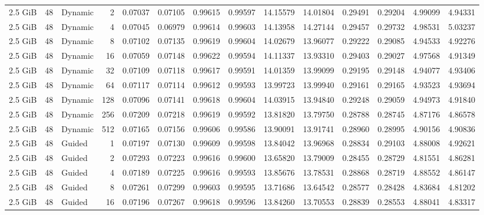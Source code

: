 \begin{table}[H]
\begin{adjustbox}{width=\textwidth, keepaspectratio}
\begin{tabular}{rrlrrrrrrrrrrr}
                    2.5 GiB & 48 & Dynamic & 2 & 0.07037 & 0.07105 & 0.99615 & 0.99597 & 14.15579 & 14.01804 & 0.29491 & 0.29204 & 4.99099 & 4.94331 \\
                    2.5 GiB & 48 & Dynamic & 4 & 0.07045 & 0.06979 & 0.99614 & 0.99603 & 14.13958 & 14.27144 & 0.29457 & 0.29732 & 4.98531 & 5.03237 \\
                    2.5 GiB & 48 & Dynamic & 8 & 0.07102 & 0.07135 & 0.99619 & 0.99604 & 14.02679 & 13.96077 & 0.29222 & 0.29085 & 4.94533 & 4.92276 \\
                    2.5 GiB & 48 & Dynamic & 16 & 0.07059 & 0.07148 & 0.99622 & 0.99594 & 14.11337 & 13.93310 & 0.29403 & 0.29027 & 4.97568 & 4.91349 \\
                    2.5 GiB & 48 & Dynamic & 32 & 0.07109 & 0.07118 & 0.99617 & 0.99591 & 14.01359 & 13.99099 & 0.29195 & 0.29148 & 4.94077 & 4.93406 \\
                    2.5 GiB & 48 & Dynamic & 64 & 0.07117 & 0.07114 & 0.99612 & 0.99593 & 13.99723 & 13.99940 & 0.29161 & 0.29165 & 4.93523 & 4.93694 \\
                    2.5 GiB & 48 & Dynamic & 128 & 0.07096 & 0.07141 & 0.99618 & 0.99604 & 14.03915 & 13.94840 & 0.29248 & 0.29059 & 4.94973 & 4.91840 \\
                    2.5 GiB & 48 & Dynamic & 256 & 0.07209 & 0.07218 & 0.99619 & 0.99592 & 13.81820 & 13.79750 & 0.28788 & 0.28745 & 4.87176 & 4.86578 \\
                    2.5 GiB & 48 & Dynamic & 512 & 0.07165 & 0.07156 & 0.99606 & 0.99586 & 13.90091 & 13.91741 & 0.28960 & 0.28995 & 4.90156 & 4.90836 \\
                    2.5 GiB & 48 & Guided & 1 & 0.07197 & 0.07130 & 0.99609 & 0.99598 & 13.84042 & 13.96968 & 0.28834 & 0.29103 & 4.88008 & 4.92621 \\
                    2.5 GiB & 48 & Guided & 2 & 0.07293 & 0.07223 & 0.99616 & 0.99600 & 13.65820 & 13.79009 & 0.28455 & 0.28729 & 4.81551 & 4.86281 \\
                    2.5 GiB & 48 & Guided & 4 & 0.07189 & 0.07225 & 0.99616 & 0.99593 & 13.85676 & 13.78531 & 0.28868 & 0.28719 & 4.88552 & 4.86147 \\
                    2.5 GiB & 48 & Guided & 8 & 0.07261 & 0.07299 & 0.99603 & 0.99595 & 13.71686 & 13.64542 & 0.28577 & 0.28428 & 4.83684 & 4.81202 \\
                    2.5 GiB & 48 & Guided & 16 & 0.07196 & 0.07267 & 0.99618 & 0.99596 & 13.84260 & 13.70553 & 0.28839 & 0.28553 & 4.88041 & 4.83317 \\

\end{tabular}
\end{adjustbox}
\end{table}
